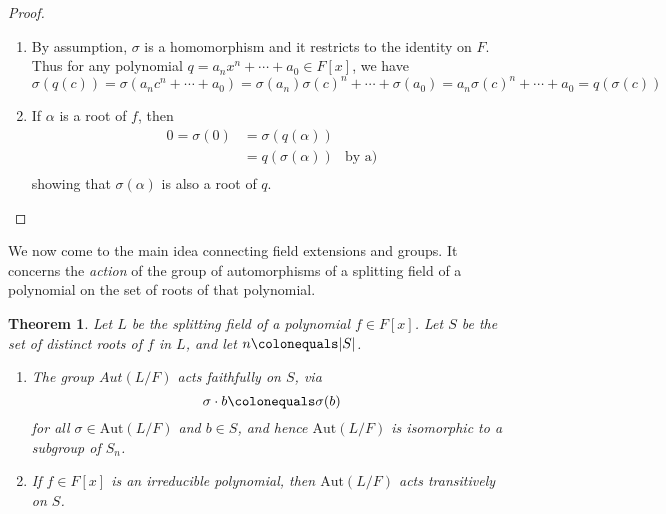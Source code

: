 \documentclass[12pt]{report}
\newtheorem{theorem}{Theorem}[chapter]
\numberwithin{equation}{section}
\numberwithin{theorem}{chapter}
\theoremstyle{definition}
\newtheorem*{basic properties}{Basic Properties}
\newtheorem*{Important Remark}{Important Remark}
\begin{document}
\begin{proof}$\,$
\begin{enumerate}[label=\alph*),leftmargin=15pt]
\item By assumption, $\sigma$ is a homomorphism and it restricts to the identity on $F$. Thus for any polynomial $q = a_nx^n + \cdots + a_0 \in F[x]$, we have
$$\sigma(q(c)) = \sigma(a_n c^n + \cdots + a_0) = \sigma(a_n) \sigma(c)^n + \cdots + \sigma(a_0) = a_n \sigma(c)^n + \cdots + a_0 = q(\sigma(c))$$
\item If $\alpha$ is a root of $f$, then
$$\begin{aligned}
0 = \sigma(0) & = \sigma(q(\alpha)) \\
& = q(\sigma(\alpha)) & \textrm{by a)}\\
\end{aligned}$$
showing that $\sigma(\alpha)$ is also a root of $q$.\qedhere
\end{enumerate}
\end{proof}

We now come to the main idea connecting field extensions and groups. It concerns the {\em action} of the group of automorphisms of a splitting field of a polynomial on the set of roots of that polynomial.

\begin{theorem}\label{aut splitting field sn}
Let $L$ be the splitting field of a polynomial $f \in F[x]$. Let $S$ be the set of distinct roots of $f$ in $L$, and let $n \colonequals |S|$. 

\begin{enumerate}[label=\alph*),leftmargin=15pt]
\item The group $Aut(L/F)$ acts faithfully on $S$, via 
$$\sigma \cdot b \colonequals \sigma(b)$$
for all $\sigma \in \mathrm{Aut}(L/F)$ and $b \in S$, and hence $\mathrm{Aut}(L/F)$ is isomorphic to a subgroup of $S_n$. 
\item If $f \in F[x]$ is an irreducible polynomial, then $\mathrm{Aut}(L/F)$ acts transitively on $S$.
\end{enumerate}
\end{theorem}
\end{document}
